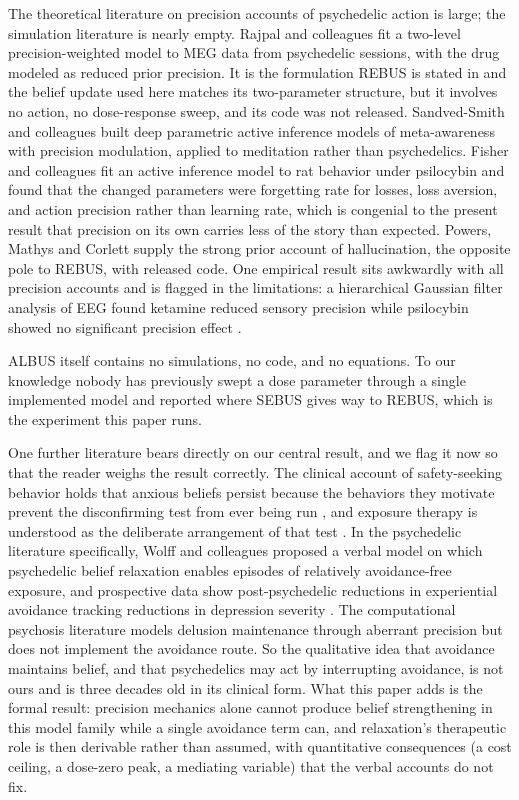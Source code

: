 \documentclass[11pt]{article}
\begin{document}
The theoretical literature on precision accounts of psychedelic action is large; the
simulation literature is nearly empty. Rajpal and colleagues \cite{rajpal2022} fit a
two-level precision-weighted model to MEG data from psychedelic sessions, with the
drug modeled as reduced prior precision. It is the formulation REBUS is stated in and
the belief update used here matches its two-parameter structure, but it involves no
action, no dose-response sweep, and its code was not released. Sandved-Smith and
colleagues \cite{sandved2021} built deep parametric active inference models of
meta-awareness with precision modulation, applied to meditation rather than
psychedelics. Fisher and colleagues \cite{fisher2024} fit an active inference model to
rat behavior under psilocybin and found that the changed parameters were forgetting
rate for losses, loss aversion, and action precision rather than learning rate, which
is congenial to the present result that precision on its own carries less of the
story than expected. Powers, Mathys and Corlett \cite{powers2017} supply the strong
prior account of hallucination, the opposite pole to REBUS, with released code. One
empirical result sits awkwardly with all precision accounts and is flagged in the
limitations: a hierarchical Gaussian filter analysis of EEG found ketamine reduced
sensory precision while psilocybin showed no significant precision effect
\cite{allohverdi2025}.

ALBUS itself \cite{safron2025} contains no simulations, no code, and no equations. To
our knowledge nobody has previously swept a dose parameter through a single
implemented model and reported where SEBUS gives way to REBUS, which is the experiment
this paper runs.

One further literature bears directly on our central result, and we flag it now so
that the reader weighs the result correctly. The clinical account of
safety-seeking behavior holds that anxious beliefs persist because the behaviors
they motivate prevent the disconfirming test from ever being run
\cite{salkovskis1991}, and exposure therapy is understood as the deliberate
arrangement of that test \cite{foakozak1986,craske2014}. In the psychedelic
literature specifically, Wolff and colleagues \cite{wolff2020} proposed a verbal
model on which psychedelic belief relaxation enables episodes of relatively
avoidance-free exposure, and prospective data show post-psychedelic reductions in
experiential avoidance tracking reductions in depression severity
\cite{zeifman2020avoid}. The computational psychosis literature models delusion
maintenance through aberrant precision \cite{corlett2010,adams2013,sterzer2018}
but does not implement the avoidance route. So the qualitative idea that avoidance
maintains belief, and that psychedelics may act by interrupting avoidance, is not
ours and is three decades old in its clinical form. What this paper adds is the
formal result: precision mechanics alone cannot produce belief strengthening in
this model family while a single avoidance term can, and relaxation's therapeutic
role is then derivable rather than assumed, with quantitative consequences
(a cost ceiling, a dose-zero peak, a mediating variable) that the verbal accounts
do not fix.
\end{document}
